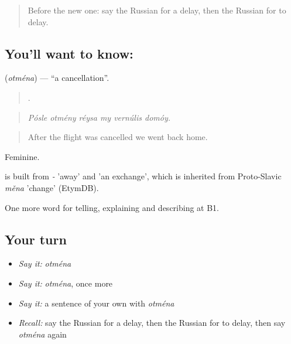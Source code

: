 \label{lesson:RU-C423-otmena}



\begin{quote}
Before the new one: say the Russian for a delay, then the Russian for to delay.
\end{quote}

\subsection*{You'll want to know: }
\textbf{} (\emph{otména}) — \textquotedblleft{}a cancellation\textquotedblright{}.

\begin{quote}
     .
\end{quote}

\begin{quote}
\emph{Pósle otmény réysa my vernúlis domóy.}
\end{quote}

\begin{quote}
After the flight was cancelled we went back home.
\end{quote}

Feminine.

\begin{cousinweb}
\emph{} is built from \emph{-} 'away' and \emph{} 'an exchange', which is inherited from Proto-Slavic \emph{měna} 'change' (EtymDB).
\end{cousinweb}

\begin{grammarlens}[title={What you've built}]
One more word for telling, explaining and describing at B1.
\end{grammarlens}

\subsection*{Your turn}
\begin{itemize}
\raggedright
  \item \emph{Say it:} \emph{otména}
  \item \emph{Say it:} \emph{otména}, once more
  \item \emph{Say it:} a sentence of your own with \emph{otména}
  \item \emph{Recall:} say the Russian for a delay, then the Russian for to delay, then say \emph{otména} again
\end{itemize}

